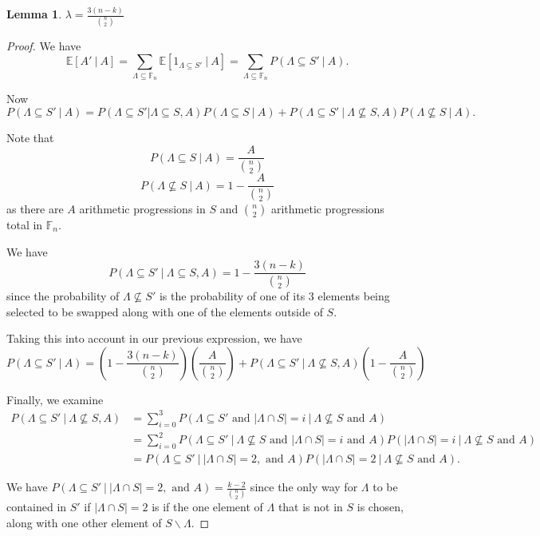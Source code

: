 \documentclass[12pt]{article} %
\newcommand{\p}[1]{\left(#1\right)}
\newcommand{\abs}[1]{\left\lvert#1\right\rvert}
\newcommand{\E}{\mathbb{E}}
\newcommand{\F}{\mathbb{F}}
\newtheorem{lem}[thm]{Lemma}
\theoremstyle{definition}
\theoremstyle{remark}
\begin{document}
\begin{lem}
$\lambda = \frac{3(n-k)}{\binom{n}{2}}$
\end{lem}
\begin{proof}

We have 
\[\E[A'\ |\ A] = \sum_{\Lambda \subseteq \F_n} \E[1_{\Lambda \subseteq S'}\ |\ A] = \sum_{\Lambda \subseteq \F_n} P(\Lambda \subseteq S'\ |\ A).\]

Now \[ P(\Lambda \subseteq S'\ |\ A) = P(\Lambda \subseteq S'| \Lambda \subseteq S, A)P(\Lambda \subseteq S\ |\ A) + P(\Lambda \subseteq S'\ |\ \Lambda \not \subseteq S, A)P(\Lambda \not \subseteq S\ |\ A).
\]

Note that 
\[P(\Lambda \subseteq S\ |\ A) = \frac{A}{\binom{n}{2}}\]
\[P(\Lambda \not \subseteq S\ |\ A) = 1-\frac{A}{\binom{n}{2}}\]
as there are $A$ arithmetic progressions in $S$ and $\binom{n}{2}$ arithmetic progressions total in $\F_n$.

We have \[P(\Lambda \subseteq S'\ |\ \Lambda \subseteq S, A) = 1- \frac{3(n-k)}{{{n}\choose{2}}}
\]
since the probability of $\Lambda \not \subseteq S'$ is the probability of one of its 3 elements being selected to be swapped along with one of the elements outside of $S$.

Taking this into account in our previous expression, we have
\[P(\Lambda \subseteq S'\ |\ A) = \p{1- \frac{3(n-k)}{{{n}\choose{2}}}}\p{\frac{A}{\binom{n}{2}}} + P(\Lambda \subseteq S'\ |\ \Lambda \not \subseteq S, A)\p{1-\frac{A}{\binom{n}{2}}}\]

Finally, we examine 
\begin{align*}
P(\Lambda \subseteq S'\ |\ \Lambda \not \subseteq S, A) &= \sum_{i = 0}^{3} P(\Lambda \subseteq S' \text{ and } \abs{\Lambda \cap S} = i\ |\ \Lambda \not \subseteq S \text{ and } A) \\
&= \sum_{i = 0}^{2} P(\Lambda \subseteq S'\ |\ \Lambda \not \subseteq S \text{ and } \abs{\Lambda \cap S} = i  \text{ and } A)P(\abs{\Lambda \cap S} = i\ |\ \Lambda \not \subseteq S \text{ and } A) \\
&= P(\Lambda \subseteq S'\ |\ \abs{\Lambda \cap S} = 2, \text{ and } A)P(\abs{\Lambda \cap S} = 2\ |\ \Lambda \not \subseteq S\text{ and } A).
\end{align*}

We have $P(\Lambda \subseteq S'\ |\ \abs{\Lambda \cap S} = 2, \text{ and } A) = \frac{k-2}{{n\choose2}}$ since the only way for $\Lambda$ to be contained in $S'$ if $\abs{\Lambda \cap S} = 2$ is if the one element of $\Lambda$ that is not in $S$ is chosen, along with one other element of $S \backslash \Lambda$.


\end{proof}
\end{document}
